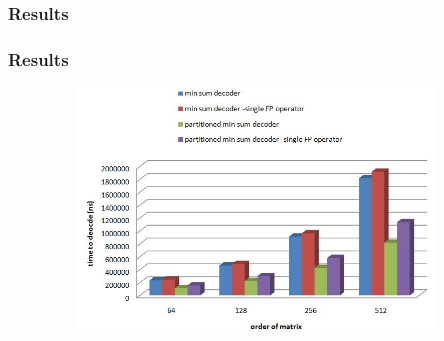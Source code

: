 \documentclass[xcolor=dvipsname]
{beamer}
\begin{document}
\subsubsection{Results}
\begin{frame}[t]
\frametitle{Results  } 
\vspace{-0.5cm} 
\begin{figure}
       \includegraphics[height=6.5cm,width=11cm]{parallel_result1}
       \end{figure}
\end{frame}
\end{document}
